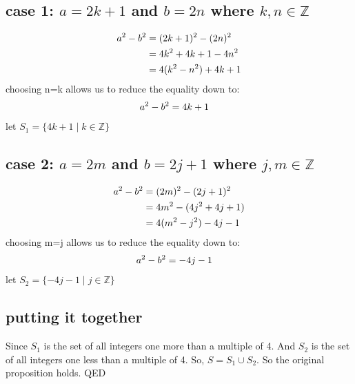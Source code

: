 \documentclass{article}
\begin{document}
\subsection*{case 1: $a=2k+1$ and $b=2n$ where $k,n \in \mathbb{Z}$}
\begin{equation}\notag
	\begin{aligned}
		a^2-b^2 &= (2k+1)^2 -(2n)^2\\
				&= 4k^2+4k+1 - 4n^2\\
				&= 4(k^2-n^2)+4k+1\\
	\end{aligned}
\end{equation}
choosing n=k allows us to reduce the equality down to:
\begin{equation}\notag
	\begin{aligned}				
		a^2-b^2 &= 4k+1
	\end{aligned}
\end{equation}
let $S_1= \lbrace 4k+1 \mid k \in \mathbb{Z}\rbrace$  

\subsection*{case 2: $a=2m$ and $b=2j+1$ where $j,m \in \mathbb{Z}$}
\begin{equation}\notag
	\begin{aligned}
		a^2-b^2 &= (2m)^2 -(2j+1)^2\\
		&= 4m^2 - (4j^2 + 4j + 1)\\
		&= 4(m^2-j^2)-4j-1\\
	\end{aligned}
\end{equation}
choosing m=j allows us to reduce the equality down to:
\begin{equation}\notag
	\begin{aligned}				
		a^2-b^2 &= -4j-1
	\end{aligned}
\end{equation}
let $S_2= \lbrace -4j-1 \mid j \in \mathbb{Z}\rbrace$  
\subsection*{putting it together}
Since $S_1$ is the set of all integers one more than a multiple of 4. And $S_2$ is the set of all integers one less than a multiple of 4. So, $S= S_1\cup S_2$. So the original proposition holds. \hfill QED 
	


 
\end{document}
